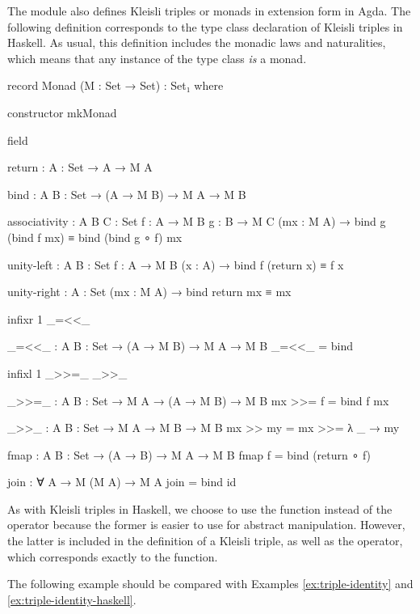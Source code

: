 The module  also defines Kleisli triples
or monads in extension form in Agda. The following definition
corresponds to the type class declaration of Kleisli triples in
Haskell. As usual, this definition includes the monadic laws and
naturalities, which means that any instance of the 
type class \emph{is} a monad.

\begin{codeagda}
record Monad (M : Set → Set) : Set₁ where

  constructor mkMonad

  field

    return : {A : Set} → A → M A

    bind   : {A B : Set} → (A → M B) → M A → M B

    associativity : {A B C : Set} {f : A → M B} {g : B → M C} (mx : M A) →
                    bind g (bind f mx) ≡ bind (bind g ∘ f) mx

    unity-left    : {A B : Set} {f : A → M B} (x : A) →
                    bind f (return x) ≡ f x

    unity-right   : {A : Set} (mx : M A) → bind return mx ≡ mx

  infixr 1 _=<<_

  _=<<_ : {A B : Set} → (A → M B) → M A → M B
  _=<<_ = bind

  infixl 1 _>>=_ _>>_

  _>>=_ : {A B : Set} → M A → (A → M B) → M B
  mx >>= f = bind f mx

  _>>_ : {A B : Set} → M A → M B → M B
  mx >> my = mx >>= λ _ → my

  fmap : {A B : Set} → (A → B) → M A → M B
  fmap f = bind (return ∘ f)

  join : ∀ {A} → M (M A) → M A
  join = bind id
\end{codeagda}

As with Kleisli triples in Haskell, we choose to use the
 function instead of the \textagda{\_>>=\_} operator
because the former is easier to use for abstract manipulation.
However, the latter is included in the definition of a Kleisli triple,
as well as the \textagda{\_=<<\_} operator, which corresponds exactly
to the  function.

The following example should be compared with Examples
\ref{ex:triple-identity} and \ref{ex:triple-identity-haskell}.

